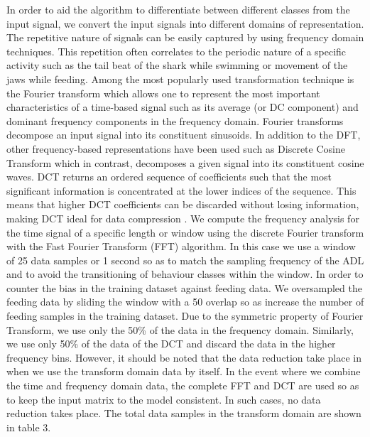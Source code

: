 \documentclass[conference]{IEEEtran}
\begin{document}
In order to aid the algorithm to differentiate between different classes from the input signal, we convert the input signals into different domains of representation. The repetitive nature of signals can be easily captured by using frequency domain techniques. This repetition often correlates to the periodic nature of a specific activity such as the tail beat of the shark while swimming or movement of the jaws while feeding. Among the most popularly used transformation technique is the Fourier transform which allows one to represent the most important characteristics of a time-based signal such as its average (or DC component) and dominant frequency components in the frequency domain. Fourier transforms decompose an input signal into its constituent sinusoids.  In addition to the DFT, other frequency-based representations have been used such as Discrete Cosine Transform which in contrast, decomposes a given signal into its constituent cosine waves. DCT returns an ordered sequence of coefficients such that the most significant information is concentrated at the lower indices of the sequence.  This means that higher DCT coefficients can be discarded without losing information, making DCT ideal for data compression \cite{15}.
We compute the frequency analysis for the time signal of a specific length or window using the discrete Fourier transform with the Fast Fourier Transform (FFT) algorithm. In this case we use a window of 25 data samples or 1 second so as to match the sampling frequency of the ADL and to avoid the transitioning of behaviour classes within the window. In order to counter the bias in the training dataset against feeding data. We oversampled the feeding data by sliding the window with a 50 overlap \cite{16} so as increase the number of feeding samples in the training dataset. Due to the symmetric property of Fourier Transform, we use only the 50\% of the data in the frequency domain. Similarly, we use only 50\% of the data of the DCT and discard the data in the higher frequency bins. However, it should be noted that the data reduction take place in when we use the transform domain data by itself. In the event where we combine the time and frequency domain data, the complete FFT and DCT are used so as to keep the input matrix to the model consistent. In such cases, no data reduction takes place. The total data samples in the transform domain are shown in table 3.
\end{document}
